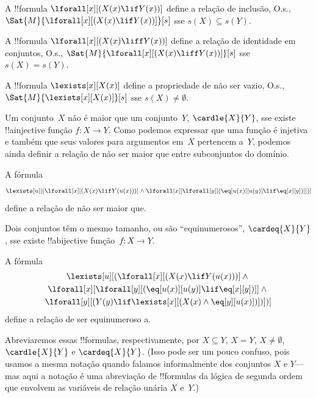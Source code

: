 \documentclass[../../../include/open-logic-section]{subfiles}
\begin{document}


\begin{prop}
A !!{formula} $\lforall[x][(X(x) \lif Y(x))]$ define a relação de inclusão,
O.s.\@, $\Sat{M}{\lforall[x][(X(x) \lif Y(x))]}[s]$ sse
$s(X) \subseteq s(Y)$.
\end{prop}

\begin{prop}
A !!{formula} $\lforall[x][(X(x) \liff Y(x))]$ define a relação de
identidade em conjuntos, O.s.\@,
$\Sat{M}{\lforall[x][(X(x) \liff Y(x))]}[s]$ sse $s(X) = s(Y)$.
\end{prop}

\begin{prop}
A !!{formula} $\lexists[x][X(x)]$ define a propriedade de não ser vazio,
O.s.\@, $\Sat{M}{\lexists[x][X(x)]}[s]$ sse $s(X) \neq \emptyset$.
\end{prop}

Um conjunto~$X$ não é maior que um conjunto~$Y$, $\cardle{X}{Y}$, sse
existe !!a{injective} função $f\colon X \to Y$. Como podemos expressar que
uma função é injetiva e também que seus valores para argumentos em~$X$
pertencem a~$Y$, podemos ainda definir a relação de não ser maior que entre
subconjuntos do domínio.

\begin{prop}
A fórmula
\[
\lexists[u][(\lforall[x][(X(x) \lif Y(u(x)))] \land \lforall[x][\lforall[y][(\eq[u(x)][u(y)] \lif
      \eq[x][y])]])]
\]
define a relação de não ser maior que.
\end{prop}

Dois conjuntos têm o mesmo tamanho, ou são ``equinumerosos'',
$\cardeq{X}{Y}$, sse existe !!a{bijective} função~$f\colon X \to Y$.

\begin{prop}
A fórmula
\begin{multline*}
  \lexists[u][(\lforall[x][(X(x) \lif Y(u(x)))] \land {}\\
    \lforall[x][\lforall[y][(\eq[u(x)][u(y)] \lif \eq[x][y])]]
  \land {} \\\lforall[y][(Y(y) \lif \lexists[x][(X(x)
      \land \eq[y][u(x)])])])]
\end{multline*}
define a relação de ser equinumeroso a.
\end{prop}

Abreviaremos essas !!{formula}s, respectivamente, por $X \subseteq Y$,
$X = Y$, $X \neq \emptyset$, $\cardle{X}{Y}$ e $\cardeq{X}{Y}$. (Isso pode
ser um pouco confuso, pois usamos a mesma notação quando falamos
informalmente dos conjuntos $X$ e $Y$---mas aqui a notação é uma abreviação
de !!{formula}s da lógica de segunda ordem que envolvem as variáveis de
relação unária $X$ e~$Y$.)
\end{document}
